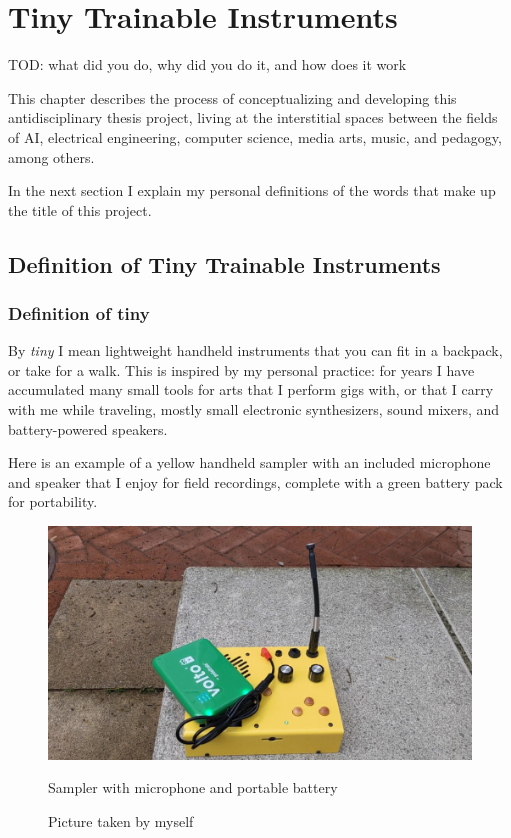 \chapter{Tiny Trainable Instruments}

TOD: what did you do, why did you do it, and how does it work

This chapter describes the process of conceptualizing and developing this antidisciplinary thesis project, living at the interstitial spaces between the fields of \acrlong{AI}, electrical engineering, computer science, media arts, music, and pedagogy, among others.

In the next section I explain my personal definitions of the words that make up the title of this project.

\section{Definition of Tiny Trainable Instruments}

\subsection{Definition of tiny}

By \emph{tiny} I mean lightweight handheld instruments that you can fit in a backpack, or take for a walk. This is inspired by my personal practice: for years I have accumulated many small tools for arts that I perform gigs with, or that I carry with me while traveling, mostly small electronic synthesizers, sound mixers, and battery-powered speakers.

Here is an example of a yellow handheld sampler with an included microphone and speaker that I enjoy for field recordings, complete with a green battery pack for portability.

\begin{figure}[ht]
  \centering
  \includegraphics[width=0.75\linewidth,height=0.25\textheight,keepaspectratio]{images/critter-and-guitari-kaleidoloop-battery.jpg}
  \caption{Sampler with microphone and portable battery}
  \caption*{Picture taken by myself}
  \label{fig:critter-and-guitari-kaleidoloop-battery}
\end{figure}

